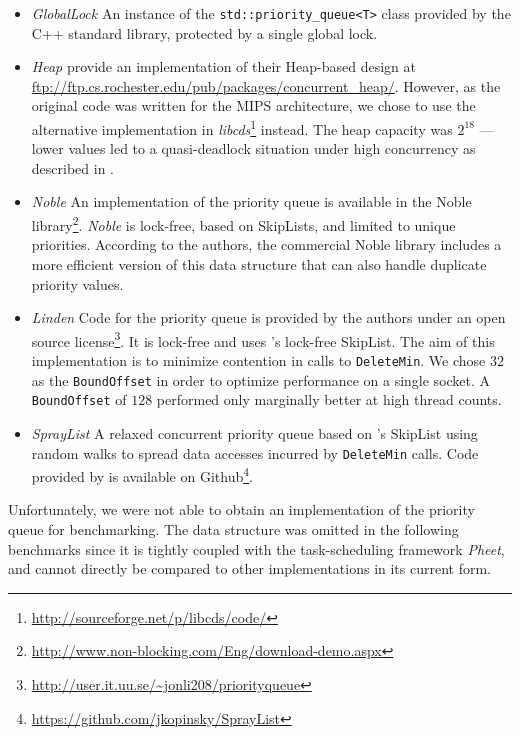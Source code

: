 \begin{itemize}
\item \textit{GlobalLock} An instance of the \lstinline|std::priority_queue<T>| class provided
      by the C++ standard library, protected by a single global lock.
\item \textit{Heap} \citeauthor{hunt1996efficient} provide an implementation
      of their Heap-based design \cite{hunt1996efficient} at \url{ftp://ftp.cs.rochester.edu/pub/packages/concurrent_heap/}.
      However, as the original code was written for the MIPS architecture, we chose to
      use the alternative implementation in \emph{libcds}\footnote{\url{http://sourceforge.net/p/libcds/code/}}
      instead. The heap capacity was $2^{18}$ --- lower values led to a quasi-deadlock situation under high concurrency
      as described in \cite{dragicevic2008survey}.
\item \textit{Noble} An implementation of the \citeauthor{sundell2003fast} priority queue \cite{sundell2003fast}
      is available in the Noble library\footnote{\url{http://www.non-blocking.com/Eng/download-demo.aspx}}.
      \textit{Noble} is lock-free, based on SkipLists, and limited to unique priorities.
      According to the authors, the commercial Noble library includes a more efficient
      version of this data structure that can also handle duplicate priority values.
\item \textit{Linden} Code for the \citeauthor{linden2013skiplist} priority queue \cite{linden2013skiplist}
      is provided by the authors under an open source license\footnote{\url{http://user.it.uu.se/~jonli208/priorityqueue}}.
      It is lock-free and uses \citeauthor{fraser2004practical}'s lock-free
      SkipList. The aim of this implementation is to minimize contention in
      calls to \lstinline|DeleteMin|. We chose $32$ as the \lstinline|BoundOffset| in order to optimize
      performance on a single socket. A \lstinline|BoundOffset| of $128$ performed only marginally better
      at high thread counts.
\item \textit{SprayList} A relaxed concurrent priority queue based on \citeauthor{fraser2004practical}'s
      SkipList using random walks to spread data accesses
      incurred by \lstinline|DeleteMin| calls. Code provided by \citeauthor{alistarhspraylist} is
      available on Github\footnote{\url{https://github.com/jkopinsky/SprayList}}.
\end{itemize}

Unfortunately, we were not able to obtain an implementation of the \citeauthor{shavit2000skiplist}
priority queue for benchmarking. The \citeauthor{wimmer2013data} data structure was omitted in the
following benchmarks since it is tightly coupled with the task-scheduling framework \emph{Pheet},
and cannot directly be compared to other implementations in its current form.

